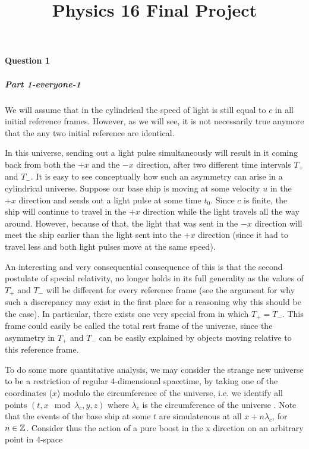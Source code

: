 \title{Physics 16 Final Project}
\newcommand{\f}{\frac} 
\newcommand{\om}{\omega}
\newcommand{\pdif}[2]{\f{\partial #1}{\partial #2}}
\newcommand{\dif}[2]{\f{d#1}{d#2}}
\newcommand{\eqdef}{\equiv}

\paragraph{Question 1}
\subparagraph*{Part 1-everyone-1}
We will assume that in the cylindrical the speed of light is still equal to $c$ in all initial reference frames. However, as we will see, it is not necessarily true anymore that the any two initial reference are identical.  \par 
In this universe, sending out a light pulse simultaneously will result in it coming back from both the $+x$ and the $-x$ direction, after two different time intervals $T_+$ and $T_-$. It is easy to see conceptually how such an asymmetry can arise in a cylindrical universe. Suppose our base ship is moving at some velocity $u$ in the $+x$ direction and sends out a light pulse at some time $t_0$. Since $c$ is finite, the ship will continue to travel in the $+x$ direction while the light travels all the way around. However, because of that, the light that was sent in the $-x$ direction will meet the ship earlier than the light sent into the $+x$ direction (since it had to travel less and both light pulses move at the same speed). \par 
An interesting and very consequential consequence of this is that the second postulate of special relativity, no longer holds in its full generality as the values of $T_+$ and $T_-$ will be different for every reference frame (see the argument for why such a discrepancy may exist in the first place for a reasoning why this should be the case). In particular, there exists one very special from in which $T_+=T_-$. This frame could easily be called the total rest frame of the universe, since the asymmetry in $T_+$ and $T_-$ can be easily explained by objects moving relative to this reference frame. \par
To do some more quantitative analysis, we may consider the strange new universe to be a restriction of regular 4-dimensional spacetime,  by taking one of the coordinates ($x$) modulo the circumference of the universe, i.e. we identify all points $(t,x \mod \lambda_c ,y,z)$ where $\lambda_c$ is the circumference of the universe . Note that the events of the base ship at some $t$ are simulatenous at all $x+n\lambda_c$, for $n\in \mathbb{Z}$. Consider thus the action of a pure boost in the x direction on an arbitrary point in 4-space
